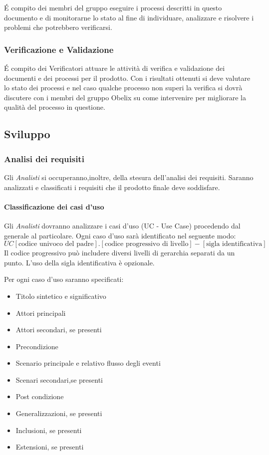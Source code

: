 \'E compito dei membri del gruppo eseguire i processi descritti in questo documento e di monitorarne lo stato al fine di individuare, analizzare e risolvere i problemi che potrebbero verificarsi.

\subsubsection{Verificazione e Validazione}

\'E compito dei Verificatori attuare le attività di verifica e validazione dei documenti e dei processi per il prodotto.
Con i risultati ottenuti si deve valutare lo stato dei processi e nel caso qualche processo non superi la verifica si dovrà discutere con i membri del gruppo Obelix su come intervenire per migliorare la qualità del processo in questione.







\subsection{Sviluppo}

\subsubsection{Analisi dei requisiti}

Gli \emph{Analisti} si occuperanno,inoltre, della stesura dell'analisi dei
requisiti. Saranno analizzati e classificati i requisiti che il
prodotto finale deve soddisfare.


\paragraph{Classificazione dei casi d'uso} 

Gli \emph{Analisti} dovranno analizzare i
casi d'uso (UC - Use Case) procedendo dal generale al particolare. Ogni
caso d'uso sarà identificato nel seguente modo: 
$$ UC[\text{codice univoco del padre}].[\text{codice progressivo di livello}]-[\text{sigla identificativa}] $$ 
Il codice progressivo può includere diversi livelli di gerarchia
separati da un punto. L'uso della sigla identificativa è
opzionale.

Per ogni caso d'uso saranno specificati:

\begin{itemize}
\item Titolo sintetico e significativo
\item Attori principali
\item Attori secondari, se presenti
\item Precondizione
\item Scenario principale e relativo flusso degli eventi
\item Scenari secondari,se presenti
\item Post condizione
\item Generalizzazioni, se presenti
\item Inclusioni, se presenti
\item Estensioni, se presenti
\end{itemize}


